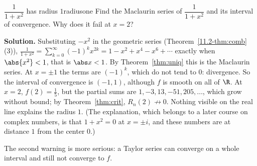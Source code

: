 \documentclass[11pt]{article}
\begin{document}
\begin{exmp}{$\dfrac1{1+x^2}$ has radius $1$}{radiusone}
Find the Maclaurin series of $\dfrac1{1+x^2}$ and its interval of convergence. Why does it fail at $x=2$?

\textbf{Solution.} Substituting $-x^2$ in the geometric series (Theorem~\ref{11.2-thm:comb}(3)), $\frac1{1+x^2}=\sum_{k=0}^\infty(-1)^kx^{2k}=1-x^2+x^4-x^6+\cdots$ exactly when $\abs{x^2}<1$, that is $\abs x<1$. By Theorem~\ref{thm:uniq} this is the Maclaurin series. At $x=\pm1$ the terms are $(-1)^k$, which do not tend to $0$: divergence. So the interval of convergence is $(-1,1)$, although $f$ is smooth on all of $\R$. At $x=2$, $f(2)=\frac15$, but the partial sums are $1,-3,13,-51,205,\dots$, which grow without bound; by Theorem~\ref{thm:crit}, $R_n(2)\not\to0$. Nothing visible on the real line explains the radius $1$. (The explanation, which belongs to a later course on complex numbers, is that $1+x^2=0$ at $x=\pm i$, and these numbers are at distance $1$ from the center $0$.)
\end{exmp}

The second warning is more serious: a Taylor series can converge on a whole interval and still not converge to $f$.
\end{document}
